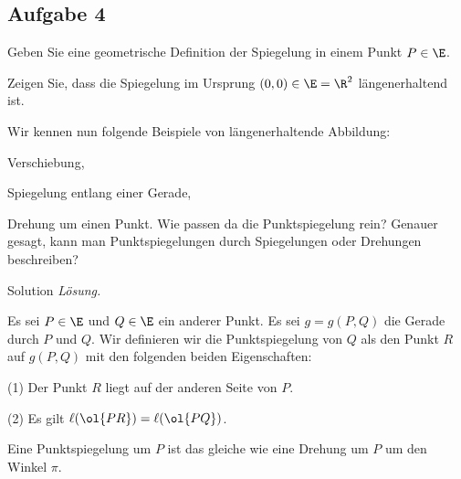 \subsection*{Aufgabe 4}
\mbox{}
\bnal
\item Geben Sie eine geometrische Definition der Spiegelung in einem Punkt $P\in \E$.
\item Zeigen Sie, dass die Spiegelung im Ursprung $(0,0)\in \E=\R^2$ l\"angenerhaltend ist.
\item 
Wir kennen nun folgende Beispiele von l\"angenerhaltende Abbildung:
\bnml
\item[(i)] Verschiebung,
\item[(ii)] Spiegelung entlang einer Gerade,
\item[(iii)]  Drehung um einen Punkt.
\enm
Wie passen da die Punktspiegelung rein? Genauer gesagt, kann man Punkt\-spiegelungen durch Spiegelungen oder Drehungen beschreiben?
\enm

\begin{taggedblock}{Solution}
\noindent \emph{L\"osung.}\mbox{}
\bnal
\item Es sei $P\in \E$ und $Q\in \E$ ein anderer  Punkt.
Es sei $g=g(P,Q)$ die Gerade durch $P$ und $Q$. Wir definieren wir die Punktspiegelung von $Q$ als den Punkt $R$ auf $g(P,Q)$ mit den folgenden beiden Eigenschaften:
\bnm
\item[(1)] Der Punkt $R$ liegt auf der anderen Seite von $P$.
\item[(2)] Es gilt $\ell(\ol{PR})=\ell(\ol{PQ})$.
\enm
\item Eine Punktspiegelung um $P$ ist das gleiche wie eine Drehung um $P$ um den Winkel $\pi$. 
\enm
\end{taggedblock}

